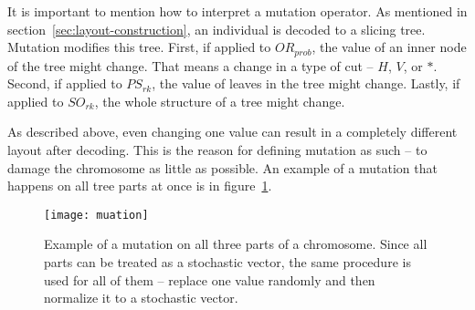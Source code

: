 It is important to mention how to interpret a mutation operator.
As mentioned in section~\ref{sec:layout-construction}, an individual is decoded to a slicing tree.
Mutation modifies this tree.
First, if applied to $OR_{prob}$, the value of an inner node of the tree might change.
That means a change in a type of cut – $H$, $V$, or $*$.
Second, if applied to $PS_{rk}$, the value of leaves in the tree might change.
Lastly, if applied to $SO_{rk}$, the whole structure of a tree might change.

As described above, even changing one value can result in a completely different layout after decoding.
This is the reason for defining mutation as such – to damage the chromosome as little as possible.
An example of a mutation that happens on all tree parts at once is in figure~\ref{fig:mutation}.


\begin{figure}[!htp]
    \texttt{[image: muation]}
    \caption[Example of a mutation on all three parts of a chromosome]{
        Example of a mutation on all three parts of a chromosome.
        Since all parts can be treated as a stochastic vector, the same procedure
        is used for all of them – replace one value randomly and then normalize it to a stochastic vector.
    }
    \label{fig:mutation}
\end{figure}
